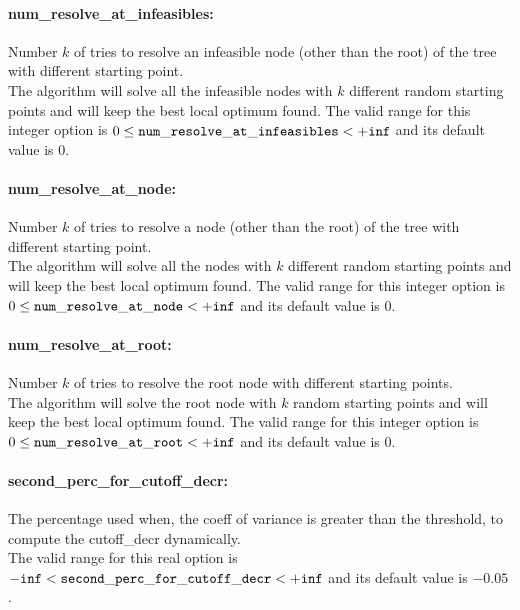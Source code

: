 \paragraph{num\_resolve\_at\_infeasibles:}\label{opt:num_resolve_at_infeasibles} Number $k$ of tries to resolve an infeasible node (other than the root) of the tree with different starting point. \\
 The algorithm will solve all the infeasible nodes with $k$ different random starting points and will keep the best local optimum found. The valid range for this integer option is
$0 \le {\tt num\_resolve\_at\_infeasibles } <  {\tt +inf}$
and its default value is $0$.


\paragraph{num\_resolve\_at\_node:}\label{opt:num_resolve_at_node} Number $k$ of tries to resolve a node (other than the root) of the tree with different starting point. \\
 The algorithm will solve all the nodes with $k$ different random starting points and will keep the best local optimum found. The valid range for this integer option is
$0 \le {\tt num\_resolve\_at\_node } <  {\tt +inf}$
and its default value is $0$.


\paragraph{num\_resolve\_at\_root:}\label{opt:num_resolve_at_root} Number $k$ of tries to resolve the root node with different starting points. \\
 The algorithm will solve the root node with $k$ random starting points and will keep the best local optimum found. The valid range for this integer option is
$0 \le {\tt num\_resolve\_at\_root } <  {\tt +inf}$
and its default value is $0$.


\paragraph{second\_perc\_for\_cutoff\_decr:}\label{opt:second_perc_for_cutoff_decr} The percentage used when, the coeff of variance is greater than the threshold, to compute the cutoff\_decr dynamically. \\
 The valid range for this real option is 
${\tt -inf} <  {\tt second\_perc\_for\_cutoff\_decr } <  {\tt +inf}$
and its default value is $-0.05$.


